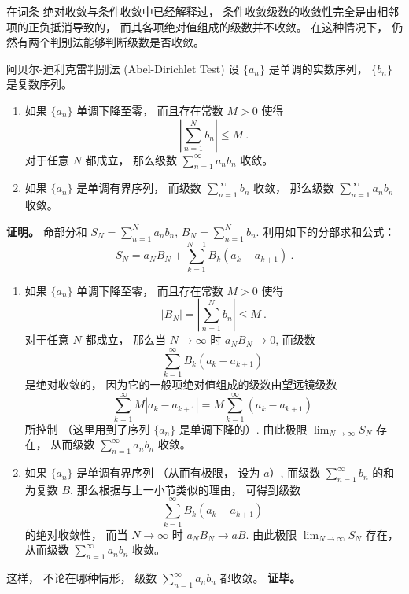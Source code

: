 

在词条 绝对收敛与条件收敛中已经解释过， 条件收敛级数的收敛性完全是由相邻项的正负抵消导致的， 而其各项绝对值组成的级数并不收敛。 在这种情况下， 仍然有两个判别法能够判断级数是否收敛。

\begin{theorem}{阿贝尔-迪利克雷判别法 (Abel-Dirichlet Test)}
设 $\{a_n\}$ 是单调的实数序列， $\{b_n\}$ 是复数序列。

\begin{enumerate}
\item 如果 $\{a_n\}$ 单调下降至零， 而且存在常数 $M>0$ 使得
$$
\left|\sum_{n=1}^N b_n\right|\leq M~.
$$
对于任意 $N$ 都成立， 那么级数 $\sum_{n=1}^\infty a_nb_n$ 收敛。

\item 如果 $\{a_n\}$ 是单调有界序列， 而级数 $\sum_{n=1}^\infty b_n$ 收敛， 那么级数 $\sum_{n=1}^\infty a_nb_n$ 收敛。
\end{enumerate}
\end{theorem}

\textbf{证明。} 命部分和 $S_N=\sum_{n=1}^N a_nb_n$, $B_N=\sum_{n=1}^N b_n$. 利用如下的分部求和公式：
$$
S_N=a_NB_N+\sum_{k=1}^{N-1}B_k(a_{k}-a_{k+1})~.
$$


\begin{enumerate}
\item 如果 $\{a_n\}$ 单调下降至零， 而且存在常数 $M>0$ 使得
$$
|B_N|=\left|\sum_{n=1}^N b_n\right|\leq M~.
$$
对于任意 $N$ 都成立， 那么当 $N\to\infty$ 时 $a_NB_N\to0$, 而级数
$$
\sum_{k=1}^{\infty}B_k(a_{k}-a_{k+1})~
$$
是绝对收敛的， 因为它的一般项绝对值组成的级数由望远镜级数
$$
\sum_{k=1}^{\infty}M|a_{k}-a_{k+1}|
=M\sum_{k=1}^{\infty}(a_{k}-a_{k+1})~
$$
所控制 （这里用到了序列 $\{a_n\}$ 是单调下降的）. 由此极限 $\lim_{N\to\infty}S_N$ 存在， 从而级数 $\sum_{n=1}^\infty a_nb_n$ 收敛。

\item 如果 $\{a_n\}$ 是单调有界序列 （从而有极限， 设为 $a$）, 而级数 $\sum_{n=1}^\infty b_n$ 的和为复数 $B$, 那么根据与上一小节类似的理由， 可得到级数
$$
\sum_{k=1}^{\infty}B_k(a_{k}-a_{k+1})~
$$
的绝对收敛性， 而当 $N\to\infty$ 时 $a_NB_N\to aB$. 由此极限 $\lim_{N\to\infty}S_N$ 存在， 从而级数 $\sum_{n=1}^\infty a_nb_n$ 收敛。
\end{enumerate}
这样， 不论在哪种情形， 级数 $\sum_{n=1}^\infty a_nb_n$ 都收敛。 \textbf{证毕。}

